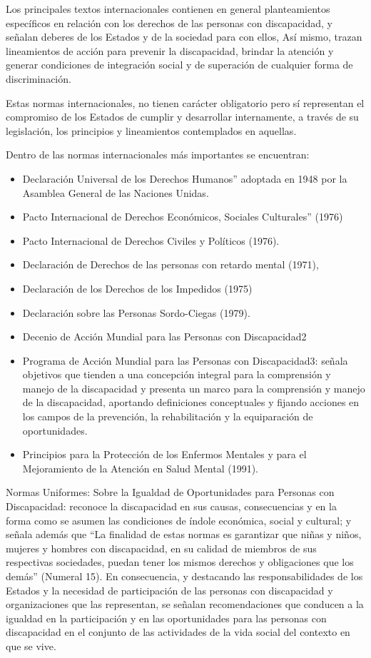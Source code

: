 \documentclass[a4paper, 12pt, oneside]{article}
\begin{document}
	Los principales textos internacionales contienen en general planteamientos específicos en relación con los derechos de las personas con discapacidad, y señalan deberes de los Estados y de la sociedad para con ellos, Así mismo, trazan lineamientos de acción para prevenir la discapacidad, brindar la atención y generar condiciones de integración social y de superación de cualquier forma de discriminación.

	Estas normas internacionales, no tienen carácter obligatorio pero sí representan el compromiso de los Estados de cumplir y desarrollar internamente, a través de su legislación, los principios y lineamientos contemplados en aquellas.

	Dentro de las normas internacionales más importantes se encuentran:

	\begin{itemize}
		\item Declaración Universal de los Derechos Humanos” adoptada en 1948 por la Asamblea General de las Naciones Unidas.
		\item Pacto Internacional de Derechos Económicos, Sociales Culturales” (1976)
		\item Pacto Internacional de Derechos Civiles y Políticos (1976).
		\item Declaración de Derechos de las personas con retardo mental (1971),
		\item Declaración de los Derechos de los Impedidos (1975)
		\item Declaración sobre las Personas Sordo-Ciegas (1979).
		\item Decenio de Acción Mundial para las Personas con Discapacidad2
		\item Programa de Acción Mundial para las Personas con Discapacidad3: señala objetivos que tienden a una concepción integral para la comprensión y manejo de la discapacidad y presenta un marco para la comprensión y manejo de la discapacidad, aportando definiciones conceptuales y fijando acciones en los campos de la prevención, la rehabilitación y la equiparación de oportunidades.
		\item Principios para la Protección de los Enfermos Mentales y para el Mejoramiento de la Atención en Salud Mental (1991).
	\end{itemize}

	Normas Uniformes: Sobre la Igualdad de Oportunidades para Personas con Discapacidad: reconoce la discapacidad en sus causas, consecuencias y en la forma como se asumen las condiciones de índole económica, social y cultural; y señala además que “La finalidad de estas normas es garantizar que niñas y niños, mujeres y hombres con discapacidad, en su calidad de miembros de sus respectivas sociedades, puedan tener los mismos derechos y obligaciones que los demás” (Numeral 15). En consecuencia, y destacando las responsabilidades de los Estados y la necesidad de participación de las personas con discapacidad y organizaciones que las representan, se señalan recomendaciones que conducen a la igualdad en la participación y en las oportunidades para las personas con discapacidad en el conjunto de las actividades de la vida social del contexto en que se vive.
\end{document}
